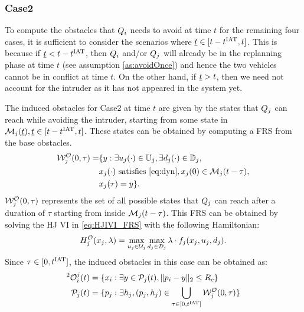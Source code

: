 \subsubsection{Case2} \label{sec:intruderObs_case2}
To compute the obstacles that $Q_i$ needs to avoid at time $t$ for the remaining four cases, it is sufficient to consider the scenarios where $\underline{t} \in [t-t^\text{IAT}, t]$. This is because if $\underline{t} < t - t^\text{IAT}$, then $Q_i$ and/or $Q_j$ will already be in the replanning phase at time $t$ (see assumption \ref{as:avoidOnce}) and hence the two vehicles cannot be in conflict at time $t$. On the other hand, if $\underline{t} > t$, then we need not account for the intruder as it has not appeared in the system yet. 

The induced obstacles for Case2 at time $t$ are given by the states that $Q_j$ can reach while avoiding the intruder, starting from some state in $\mathcal{M}_j(\underline{t}), \underline{t} \in [t-t^\text{IAT}, t]$. These states can be obtained by computing a FRS from the base obstacles.
\begin{equation} \label{eq:ObsFRS_case2}
\begin{aligned}
\frs_{j}^{\mathcal{O}}(0, \tau) = & \{y: \exists \ctrl_j(\cdot) \in \cfset_j, \exists \dstb_j(\cdot) \in \dfset_j, \\
& \state_j(\cdot) \text{ satisfies \eqref{eq:dyn}}, \state_j(0) \in \boset_j(t-\tau), \\
& \state_j(\tau) = y\}.
\end{aligned}
\end{equation}
$\mathcal{W}_{j}^{\mathcal{O}}(0, \tau)$ represents the set of all possible states that $Q_j$ can reach after a duration of $\tau$ starting from inside $\mathcal{M}_j(t-\tau)$. This FRS can be obtained by solving the HJ VI in \eqref{eq:HJIVI_FRS} with the following Hamiltonian:
\begin{equation}
H_{j}^{\mathcal{O}}(x_j, \lambda) = \max_{u_j \in \mathcal{U}_j} \max_{d_j \in \mathcal{D}_j} \lambda \cdot f_j (x_j, u_j, d_j).
\end{equation} 
Since $\tau \in [0, t^\text{IAT}]$, the induced obstacles in this case can be obtained as:
\begin{equation} \label{eq:intruderObs_case2} 
\begin{aligned}
^2\ioset_i^j(t) & = \{\state_i: \exists y \in \pfrs_j(t), \|\pos_i - y\|_2 \le \rc \}\\
\pfrs_j(t) & = \{p_j: \exists \npos_j, (p_j, \npos_j) \in \bigcup_{\tau \in [0, \iat]} \frs_{j}^{\mathcal{O}}(0, \tau) \}
\end{aligned}
\end{equation}

